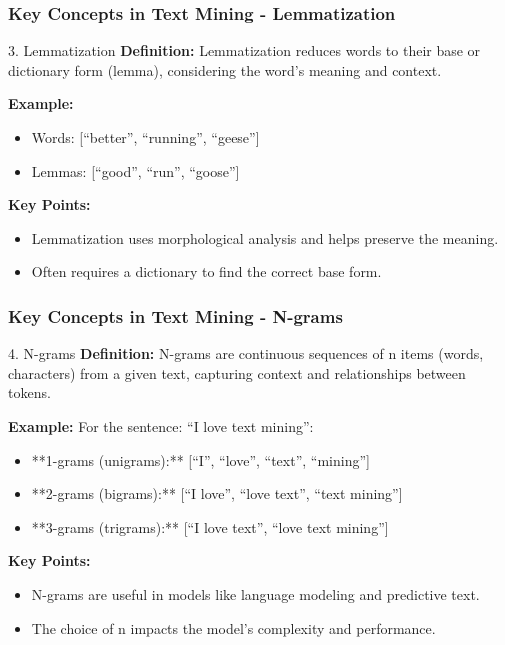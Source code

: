 \documentclass[aspectratio=169]{beamer}
\begin{document}
\begin{frame}[fragile]
    \frametitle{Key Concepts in Text Mining - Lemmatization}
    \begin{block}{3. Lemmatization}
        \textbf{Definition:} Lemmatization reduces words to their base or dictionary form (lemma), considering the word's meaning and context.

        \textbf{Example:}
        \begin{itemize}
            \item Words: [``better'', ``running'', ``geese'']
            \item Lemmas: [``good'', ``run'', ``goose'']
        \end{itemize}
        
        \textbf{Key Points:}
        \begin{itemize}
            \item Lemmatization uses morphological analysis and helps preserve the meaning.
            \item Often requires a dictionary to find the correct base form.
        \end{itemize}
    \end{block}
\end{frame}

\begin{frame}[fragile]
    \frametitle{Key Concepts in Text Mining - N-grams}
    \begin{block}{4. N-grams}
        \textbf{Definition:} N-grams are continuous sequences of n items (words, characters) from a given text, capturing context and relationships between tokens.

        \textbf{Example:} For the sentence: ``I love text mining'': 
        \begin{itemize}
            \item **1-grams (unigrams):** [``I'', ``love'', ``text'', ``mining'']
            \item **2-grams (bigrams):** [``I love'', ``love text'', ``text mining'']
            \item **3-grams (trigrams):** [``I love text'', ``love text mining'']
        \end{itemize}

        \textbf{Key Points:}
        \begin{itemize}
            \item N-grams are useful in models like language modeling and predictive text.
            \item The choice of n impacts the model's complexity and performance.
        \end{itemize}
    \end{block}
\end{frame}
\end{document}

